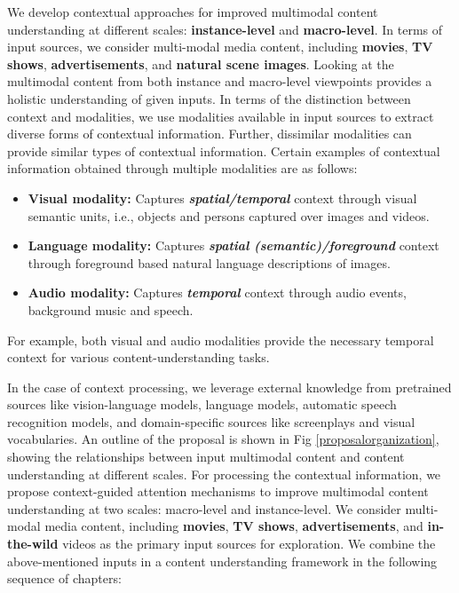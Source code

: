 We develop contextual approaches for improved multimodal content understanding at different scales: \textbf{instance-level} and \textbf{macro-level}.  In terms of input sources, we consider multi-modal media content, including \textbf{movies}, \textbf{TV shows}, \textbf{advertisements}, and \textbf{natural scene images}. Looking at the multimodal content from both instance and macro-level viewpoints provides a holistic understanding of given inputs. In terms of the distinction between context and modalities, we use modalities available in input sources to extract diverse forms of contextual information. Further, dissimilar modalities can provide similar types of contextual information. Certain examples of contextual information obtained through multiple modalities are as follows: 

\begin{itemize}
    \item  \textbf{Visual modality:} Captures \textbf{\textit{spatial/temporal}} context through visual semantic units, i.e., objects and persons captured over images and videos.
    \item  \textbf{Language modality:} Captures \textbf{\textit{spatial (semantic)/foreground}} context through foreground based natural language descriptions of images.
    \item  \textbf{Audio modality:} Captures \textbf{\textit{temporal}} context through audio events, background music and speech.
\end{itemize}


For example, both visual and audio modalities provide the necessary temporal context for various content-understanding tasks.
\par 
In the case of context processing, we leverage external knowledge from pretrained sources like vision-language models, language models, automatic speech recognition models, and domain-specific sources like screenplays and visual vocabularies. 
An outline of the proposal is shown in Fig \ref{proposalorganization}, showing the relationships between input multimodal content and content understanding at different scales. For processing the contextual information, we propose context-guided attention mechanisms to improve multimodal content understanding at two scales: macro-level and instance-level. We consider multi-modal media content, including \textbf{movies}, \textbf{TV shows}, \textbf{advertisements}, and \textbf{in-the-wild} videos as the primary input sources for exploration.
We combine the above-mentioned inputs in a content understanding framework in the following sequence of chapters:

